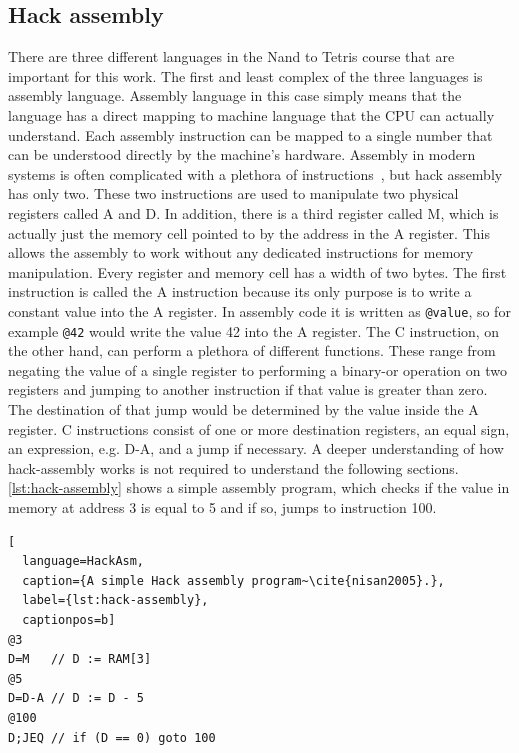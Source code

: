 \subsection{Hack assembly} \label{hack-assembly}
There are three different languages in the Nand to Tetris course that are important for this work.
The first and least complex of the three languages is assembly language.
Assembly language in this case simply means that the language has a direct mapping to machine language that the CPU can actually understand.
Each assembly instruction can be mapped to a single number that can be understood directly by the machine's hardware.
Assembly in modern systems is often complicated with a plethora of instructions~\cite{guide2011intel}, but hack assembly has only two.
These two instructions are used to manipulate two physical registers called A and D.
In addition, there is a third register called M, which is actually just the memory cell pointed to by the address in the A register.
This allows the assembly to work without any dedicated instructions for memory manipulation.
Every register and memory cell has a width of two bytes.
The first instruction is called the A instruction because its only purpose is to write a constant value into the A register.
In assembly code it is written as \verb+@value+, so for example \verb+@42+ would write the value 42 into the A register.
The C instruction, on the other hand, can perform a plethora of different functions.
These range from negating the value of a single register to performing a binary-or operation on two registers and jumping to another instruction if that value is greater than zero.
The destination of that jump would be determined by the value inside the A register.
C instructions consist of one or more destination registers, an equal sign, an expression, e.g. D-A, and a jump if necessary.
A deeper understanding of how hack-assembly works is not required to understand the following sections.
\cref{lst:hack-assembly} shows a simple assembly program, which checks if the value in memory at address 3 is equal to 5 and if so, jumps to instruction 100.

\begin{lstlisting}[
  language=HackAsm,
  caption={A simple Hack assembly program~\cite{nisan2005}.},
  label={lst:hack-assembly},
  captionpos=b]
@3
D=M   // D := RAM[3]
@5
D=D-A // D := D - 5
@100
D;JEQ // if (D == 0) goto 100
\end{lstlisting}

